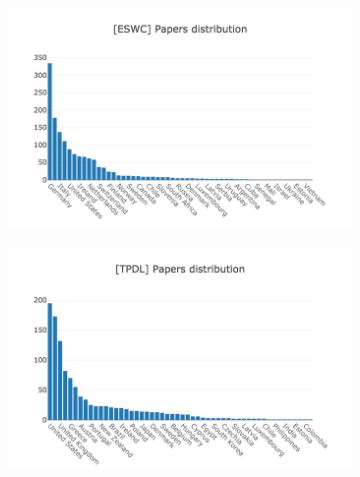 \documentclass{llncs}
\begin{document}
\begin{figure}[t]
\begin{subfigure}{.5\textwidth}
    \includegraphics[width=\textwidth]{images/eswc_dois_longtail.png}
	\caption[ ]{}
	\label{fig:eswc_dois_longtail}
\end{subfigure}
\centering
\begin{subfigure}{.5\textwidth}
	\centering
    \includegraphics[width=\textwidth]{images/tpdl_dois_longtail.png}

\end{subfigure}
\end{figure}
\end{document}
